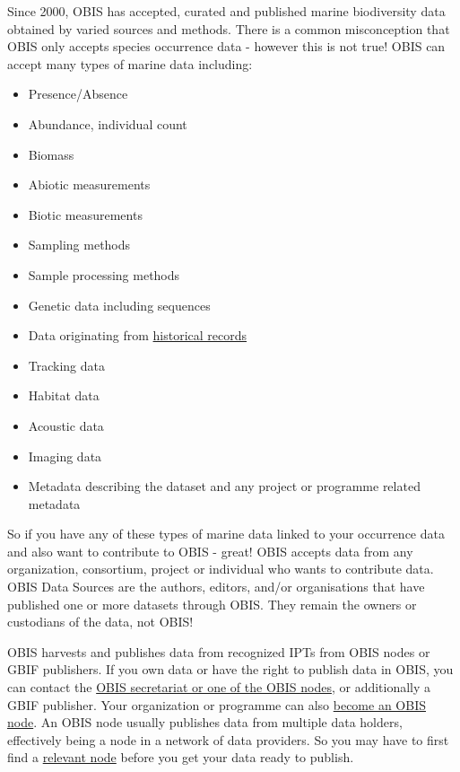 \documentclass[
  letterpaper,
  DIV=11,
  numbers=noendperiod,
  oneside]{scrreprt}
\providecommand{\tightlist}{%
  \setlength{\itemsep}{0pt}\setlength{\parskip}{0pt}}\usepackage{longtable,booktabs,array}
\begin{document}
Since 2000, OBIS has accepted, curated and published marine biodiversity
data obtained by varied sources and methods. There is a common
misconception that OBIS only accepts species occurrence data - however
this is not true! OBIS can accept many types of marine data including:

\begin{itemize}
\tightlist
\item
  Presence/Absence
\item
  Abundance, individual count
\item
  Biomass
\item
  Abiotic measurements
\item
  Biotic measurements
\item
  Sampling methods
\item
  Sample processing methods
\item
  Genetic data including sequences
\item
  Data originating from \href{common_formatissues.html}{historical
  records}
\item
  Tracking data
\item
  Habitat data
\item
  Acoustic data
\item
  Imaging data
\item
  Metadata describing the dataset and any project or programme related
  metadata
\end{itemize}

So if you have any of these types of marine data linked to your
occurrence data and also want to contribute to OBIS - great! OBIS
accepts data from any organization, consortium, project or individual
who wants to contribute data. OBIS Data Sources are the authors,
editors, and/or organisations that have published one or more datasets
through OBIS. They remain the owners or custodians of the data, not
OBIS!

OBIS harvests and publishes data from recognized IPTs from OBIS nodes or
GBIF publishers. If you own data or have the right to publish data in
OBIS, you can contact the \href{https://obis.org/contact/}{OBIS
secretariat or one of the OBIS nodes}, or additionally a GBIF publisher.
Your organization or programme can also \href{nodes.html}{become an OBIS
node}. An OBIS node usually publishes data from multiple data holders,
effectively being a node in a network of data providers. So you may have
to first find a \href{https://obis.org/contact/}{relevant node} before
you get your data ready to publish.
\end{document}

